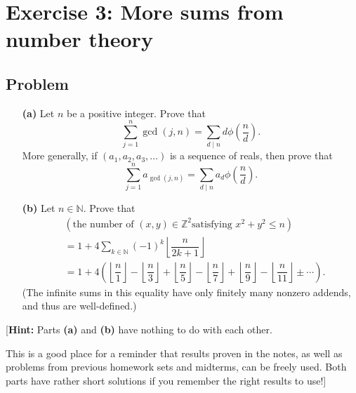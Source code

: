 \documentclass[paper=a4, fontsize=12pt]{scrartcl}%
\let\sumnonlimits\sum
\renewcommand{\sum}{\sumnonlimits\limits}
\theoremstyle{plainsl}
\theoremstyle{definition}
\theoremstyle{remark}
\begin{document}
\section{Exercise 3: More sums from number theory}

\subsection{Problem}

\begin{enumerate}
\item[\textbf{(a)}] Let $n$ be a positive integer. Prove that
\begin{equation}
\sum_{j=1}^{n}\gcd\left(  j,n\right)  =\sum_{d\mid n}d\phi\left(  \dfrac{n}%
{d}\right)  . \label{eq.exe.ent.more-sums.a.1}%
\end{equation}
More generally, if $\left(  a_{1},a_{2},a_{3},\ldots\right)  $ is a sequence
of reals, then prove that
\begin{equation}
\sum_{j=1}^{n}a_{\gcd\left(  j,n\right)  }=\sum_{d\mid n}a_{d}\phi\left(
\dfrac{n}{d}\right)  . \label{eq.exe.ent.more-sums.a.2}%
\end{equation}


\item[\textbf{(b)}] Let $n \in\mathbb{N}$. Prove that
\begin{align*}
&  \left(  \text{the number of $\left(  x, y \right)  \in\mathbb{Z}^{2}$
satisfying $x^{2} + y^{2} \leq n$} \right) \\
&  = 1 + 4\sum_{k \in\mathbb{N}} \left(  -1 \right)  ^{k} \left\lfloor
\dfrac{n}{2k+1} \right\rfloor \\
&  = 1 + 4 \left(  \left\lfloor \dfrac{n}{1} \right\rfloor - \left\lfloor
\dfrac{n}{3} \right\rfloor + \left\lfloor \dfrac{n}{5} \right\rfloor -
\left\lfloor \dfrac{n}{7} \right\rfloor + \left\lfloor \dfrac{n}{9}
\right\rfloor - \left\lfloor \dfrac{n}{11} \right\rfloor \pm\cdots\right)  .
\end{align*}
(The infinite sums in this equality have only finitely many nonzero addends,
and thus are well-defined.)
\end{enumerate}

[\textbf{Hint:} Parts \textbf{(a)} and \textbf{(b)} have nothing to do with
each other.

This is a good place for a reminder that results proven in the notes, as well
as problems from previous homework sets and midterms, can be freely used. Both
parts have rather short solutions if you remember the right results to use!]
\end{document}
